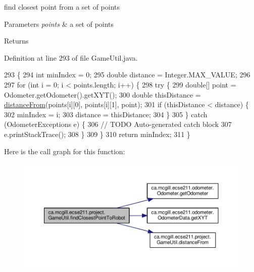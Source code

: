 find closest point from a set of points


\begin{DoxyParams}{Parameters}
{\em points} & a set of points \\
\hline
\end{DoxyParams}
\begin{DoxyReturn}{Returns}

\end{DoxyReturn}


Definition at line 293 of file Game\+Util.\+java.


\begin{DoxyCode}
293                                                             \{
294     \textcolor{keywordtype}{int} minIndex = 0;
295     \textcolor{keywordtype}{double} distance = Integer.MAX\_VALUE;
296 
297     \textcolor{keywordflow}{for} (\textcolor{keywordtype}{int} i = 0; i < points.length; i++) \{
298       \textcolor{keywordflow}{try} \{
299         \textcolor{keywordtype}{double}[] point = Odometer.getOdometer().getXYT();
300         \textcolor{keywordtype}{double} thisDistance = \hyperlink{classca_1_1mcgill_1_1ecse211_1_1project_1_1_game_util_a6fb324a3d5e42414c83dfd8bd5910b56}{distanceFrom}(points[i][0], points[i][1], point);
301         \textcolor{keywordflow}{if} (thisDistance < distance) \{
302           minIndex = i;
303           distance = thisDistance;
304         \}
305       \} \textcolor{keywordflow}{catch} (OdometerExceptions e) \{
306         \textcolor{comment}{// TODO Auto-generated catch block}
307         e.printStackTrace();
308       \}
309     \}
310     \textcolor{keywordflow}{return} minIndex;
311   \}
\end{DoxyCode}
Here is the call graph for this function\+:
\nopagebreak
\begin{figure}[H]
\begin{center}
\leavevmode
\includegraphics[width=350pt]{classca_1_1mcgill_1_1ecse211_1_1project_1_1_game_util_a6e0ee94b800ca3727ca8009782abda14_cgraph}
\end{center}
\end{figure}

